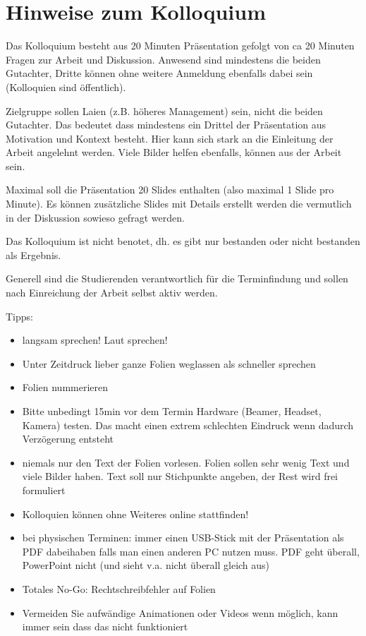 \documentclass[12pt,oneside]{article}
\begin{document}
\section{Hinweise zum Kolloquium}
Das Kolloquium besteht aus 20 Minuten Präsentation gefolgt von ca 20 Minuten Fragen zur Arbeit und Diskussion. Anwesend sind mindestens die beiden Gutachter, Dritte können ohne weitere Anmeldung ebenfalls dabei sein (Kolloquien sind öffentlich). 

Zielgruppe sollen Laien (z.B. höheres Management) sein, nicht die beiden Gutachter. Das bedeutet dass mindestens ein Drittel der Präsentation aus Motivation und Kontext besteht. Hier kann sich stark an die Einleitung der Arbeit angelehnt werden. Viele Bilder helfen ebenfalls, können aus der Arbeit sein.

Maximal soll die Präsentation 20 Slides enthalten (also maximal 1 Slide pro Minute). Es können zusätzliche Slides mit Details erstellt werden die vermutlich in der Diskussion sowieso gefragt werden.

Das Kolloquium ist nicht benotet, dh. es gibt nur bestanden oder nicht bestanden als Ergebnis. 

Generell sind die Studierenden verantwortlich für die Terminfindung und sollen nach Einreichung der Arbeit selbst aktiv werden. 

Tipps:
\begin{itemize}
    \item langsam sprechen! Laut sprechen!
    \item Unter Zeitdruck lieber ganze Folien weglassen als schneller sprechen
    \item Folien nummerieren
    \item Bitte unbedingt 15min vor dem Termin Hardware (Beamer, Headset, Kamera) testen. Das macht einen extrem schlechten Eindruck wenn dadurch Verzögerung entsteht
    \item niemals nur den Text der Folien vorlesen. Folien sollen sehr wenig Text und viele Bilder haben. Text soll nur Stichpunkte angeben, der Rest wird frei formuliert
    \item Kolloquien können ohne Weiteres online stattfinden!
    \item bei physischen Terminen: immer einen USB-Stick mit der Präsentation als PDF dabeihaben falls man einen anderen PC nutzen muss. PDF geht überall, PowerPoint nicht (und sieht v.a. nicht überall gleich aus)
    \item Totales No-Go: Rechtschreibfehler auf Folien
    \item Vermeiden Sie aufwändige Animationen oder Videos wenn möglich, kann immer sein dass das nicht funktioniert
\end{itemize}
\end{document}
